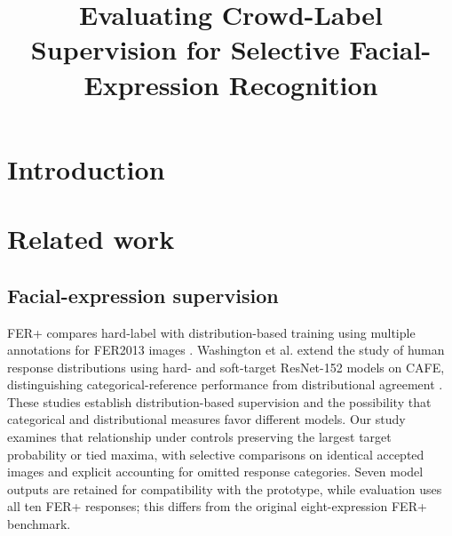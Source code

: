 \documentclass[pdflatex,sn-mathphys-num]{sn-jnl}
\begin{document}
\title[Crowd-label supervision for selective FER]{Evaluating Crowd-Label Supervision for Selective Facial-Expression Recognition}
\author[1]{ }
\author[2]{ }
\author*[3]{ }
\author[4]{ }
\abstract{}
\maketitle

\section{Introduction}


\section{Related work}
\subsection{Facial-expression supervision}
FER+ compares hard-label with distribution-based training using multiple annotations for FER2013 images \cite{barsoum2016ferplus}. Washington et al. extend the study of human response distributions using hard- and soft-target ResNet-152 models on CAFE, distinguishing categorical-reference performance from distributional agreement \cite{washington2021crowdsourcing}. These studies establish distribution-based supervision and the possibility that categorical and distributional measures favor different models. Our study examines that relationship under controls preserving the largest target probability or tied maxima, with selective comparisons on identical accepted images and explicit accounting for omitted response categories. Seven model outputs are retained for compatibility with the prototype, while evaluation uses all ten FER+ responses; this differs from the original eight-expression FER+ benchmark.
\end{document}

